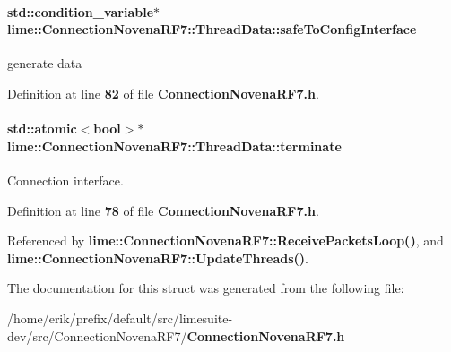 \paragraph[{safe\+To\+Config\+Interface}]{\setlength{\rightskip}{0pt plus 5cm}std\+::condition\+\_\+variable$\ast$ lime\+::\+Connection\+Novena\+R\+F7\+::\+Thread\+Data\+::safe\+To\+Config\+Interface}\label{structlime_1_1ConnectionNovenaRF7_1_1ThreadData_a8f2e8a19a5f1e73a2c34e28a9a3d5914}


generate data 



Definition at line {\bf 82} of file {\bf Connection\+Novena\+R\+F7.\+h}.

\paragraph[{terminate}]{\setlength{\rightskip}{0pt plus 5cm}std\+::atomic$<$bool$>$$\ast$ lime\+::\+Connection\+Novena\+R\+F7\+::\+Thread\+Data\+::terminate}\label{structlime_1_1ConnectionNovenaRF7_1_1ThreadData_a543c6b86b95ed0a162f1556ba2ad4c12}


Connection interface. 



Definition at line {\bf 78} of file {\bf Connection\+Novena\+R\+F7.\+h}.



Referenced by {\bf lime\+::\+Connection\+Novena\+R\+F7\+::\+Receive\+Packets\+Loop()}, and {\bf lime\+::\+Connection\+Novena\+R\+F7\+::\+Update\+Threads()}.



The documentation for this struct was generated from the following file\+:\begin{DoxyCompactItemize}
\item 
/home/erik/prefix/default/src/limesuite-\/dev/src/\+Connection\+Novena\+R\+F7/{\bf Connection\+Novena\+R\+F7.\+h}\end{DoxyCompactItemize}
